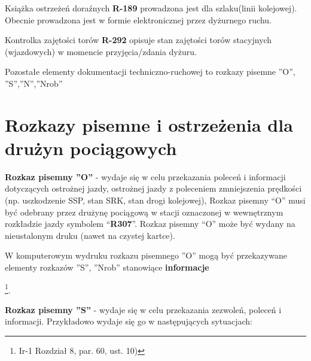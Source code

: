 Książka ostrzeżeń doraźnych \textbf{R-189} prowadzona jest dla szlaku(linii kolejowej). Obecnie prowadzona jest w formie elektronicznej przez dyżurnego ruchu.

Kontrolka zajętości torów \textbf{R-292} opisuje stan zajętości torów stacyjnych (wjazdowych) w momencie przyjęcia/zdania dyżuru.

Pozostałe elementy dokumentacji techniczno-ruchowej to rozkazy pisemne ''O'', ''S'',''N'',''Nrob''

\chapter{Rozkazy pisemne i ostrzeżenia dla drużyn pociągowych}

\textbf{Rozkaz pisemny ''O''} - wydaje się w celu przekazania poleceń i informacji dotyczących ostrożnej jazdy, ostrożnej
jazdy z poleceniem zmniejszenia prędkości (np. uszkodzenie SSP, stan SRK, stan drogi kolejowej), Rozkaz pisemny “O”
musi być odebrany przez drużynę pociągową w stacji oznaczonej w wewnętrznym rozkładzie jazdy symbolem “\textbf{R307}”.
Rozkaz pisemny “O” może być wydany na nieustalonym druku (nawet na czystej kartce).  \begin{tcolorbox}[colback=green!5!white,colframe=green!45!black,width=10cm,title=Rozkaz pisemny ''O'']
	W komputerowym wydruku rozkazu pisemnego ''O'' mogą być przekazywane elementy rozkazów ''S'', ''Nrob'' stanowiące \textbf{informacje}
\end{tcolorbox}
 \footnote{Ir-1 Rozdział 8, par. 60, ust. 10)}. 

\textbf{Rozkaz pisemny ''S''} - wydaje się w celu przekazania zezwoleń, poleceń i informacji. Przykładowo wydaje się go w
następujących sytuacjach:

